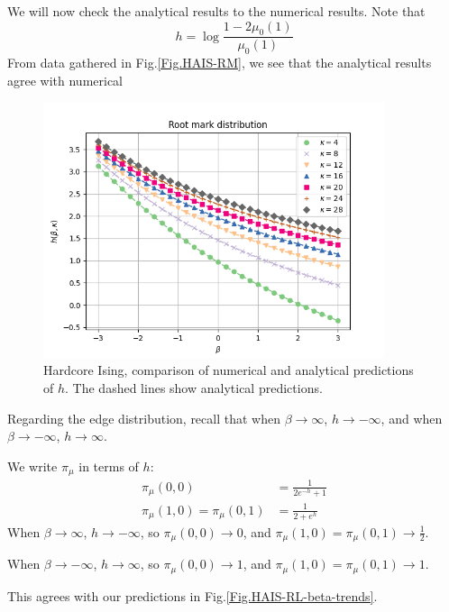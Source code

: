 \documentclass[12pt]{article}
\numberwithin{equation}{section}
\begin{document}
We will now check the analytical results to the numerical results. Note that
\begin{equation*}
    h = \log\frac{1 - 2 \mu_0(1)}{\mu_0(1)}
\end{equation*}
From data gathered in Fig.\ref{Fig.HAIS-RM}, we see that the analytical results agree with numerical
\begin{figure}[h]
    \centering
    \includegraphics[width=10cm]{img/HA_Ising/h_value.png}
    \caption{Hardcore Ising, comparison of numerical and analytical predictions of $h$. The dashed lines show analytical predictions.}
    \label{Fig.HAIS-h-value}
\end{figure}

Regarding the edge distribution, recall that when $\beta\rightarrow\infty$, $h\rightarrow -\infty$, and when $\beta\rightarrow-\infty$, $h\rightarrow \infty$.

We write $\pi_\mu$ in terms of $h$:
\begin{equation}
    \begin{aligned}
        \pi_\mu(0, 0)                 & = \frac{1}{2e^{-h} + 1} \\
        \pi_\mu(1, 0) = \pi_\mu(0, 1) & = \frac{1}{2+e^h}
    \end{aligned}
    \label{Eq.HAIS-pimu-h}
\end{equation}
When $\beta\rightarrow\infty$, $h\rightarrow-\infty$, so $\pi_\mu(0, 0)\rightarrow 0$, and $\pi_\mu(1, 0) = \pi_\mu(0, 1)\rightarrow \frac12$.

When $\beta\rightarrow-\infty$, $h\rightarrow\infty$, so $\pi_\mu(0, 0)\rightarrow 1$, and $\pi_\mu(1, 0) = \pi_\mu(0, 1)\rightarrow 1$.

This agrees with our predictions in Fig.\ref{Fig.HAIS-RL-beta-trends}.

\newpage
\end{document}
